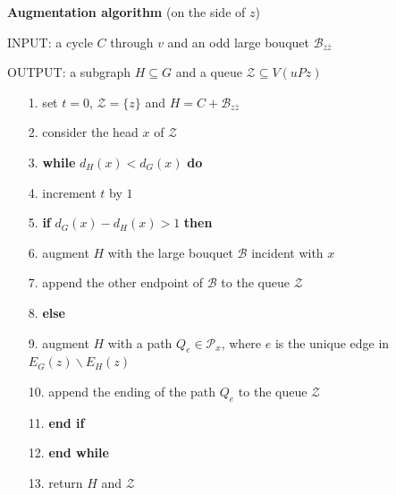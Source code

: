 \documentclass[a4paper,12pt]{article}
\numberwithin{equation}{section}
\begin{document}
\bigskip

\noindent \textbf{Augmentation algorithm} (on the side of $z$)

\medskip

\noindent INPUT: a cycle $C$ through $v$ and an odd large bouquet $\mathcal{B}_{z\overline{z}}$

\smallskip

\noindent OUTPUT: a subgraph $H\subseteq G$ and a queue $\mathcal{Z}\subseteq V(uPz)$

\medskip

\begin{enumerate}

\item[1.] set $t=0$, $\mathcal{Z}=\{z\}$ and $H=C+\mathcal{B}_{z\overline{z}}$\\[-8mm]
\item[2.] consider the head $x$ of $\mathcal{Z}$\\[-8mm]
\item[3.] \textbf{while} $d_H(x)<d_G(x)$ \textbf{do}\\[-8mm]
\item[4.] \quad\quad increment $t$ by $1$\\[-8mm]
\item[5.] \quad\quad \textbf{if} $d_G(x)-d_H(x)>1$ \textbf{then}\\[-8mm]
\item[6.] \quad\quad\quad\quad augment $H$ with the large bouquet $\mathcal{B}$ incident with $x$\\[-8mm]
\item[7.] \quad\quad\quad\quad append the other endpoint of $\mathcal{B}$ to the queue $\mathcal{Z}$\\[-8mm]
\item[8.] \quad\quad \textbf{else}\\[-8mm]
\item[9.] \quad\quad\quad\quad augment $H$ with a path $Q_e\in\mathcal{P}_x$, where $e$ is the unique edge in $E_G(z)\backslash E_H(z)$\\[-8mm]
\item[10.] \quad\quad\quad\quad append the ending of the path $Q_e$ to the queue $\mathcal{Z}$\\[-8mm]
\item[11.] \quad\quad \textbf{end if}\\[-8mm]
\item[12.] \textbf{end while}\\[-8mm]
\item[13.] return $H$ and $\mathcal{Z}$\\[-8mm]

\end{enumerate}
\end{document}
